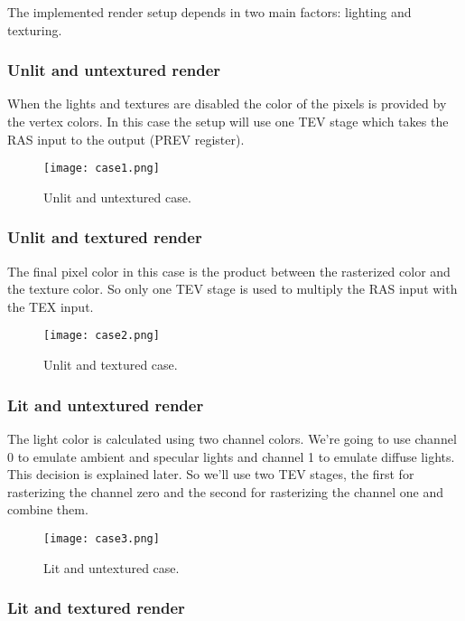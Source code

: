 \documentclass[12pt]{article}
\begin{document}
The implemented render setup depends in two main factors: lighting and texturing.

\subsubsection{Unlit and untextured render}

When the lights and textures are disabled the color of the pixels is provided by the vertex colors. In this case the setup will use one TEV stage which takes the RAS input to the output (PREV register).

\begin{figure}[ht]
\centering
\texttt{[image: case1.png]}
\caption{Unlit and untextured case. }
\label{fig:case1}
\end {figure}

\subsubsection{Unlit and textured render}

The final pixel color in this case is the product between the rasterized color and the texture color. So only one TEV stage is used to multiply the RAS input with the TEX input.

\begin{figure}[ht]
\centering
\texttt{[image: case2.png]}
\caption{Unlit and textured case. }
\label{fig:case2}
\end {figure}

\subsubsection{Lit and untextured render}

The light color is calculated using two channel colors. We're going to use channel 0 to emulate ambient and specular lights and channel 1 to emulate diffuse lights. This decision is explained later. So we'll use two TEV stages, the first for rasterizing the channel zero and the second for rasterizing the channel one and combine them.

\begin{figure}[ht]
\centering
\texttt{[image: case3.png]}
\caption{Lit and untextured case. }
\label{fig:case3}
\end {figure}

\subsubsection{Lit and textured render}
\end{document}
